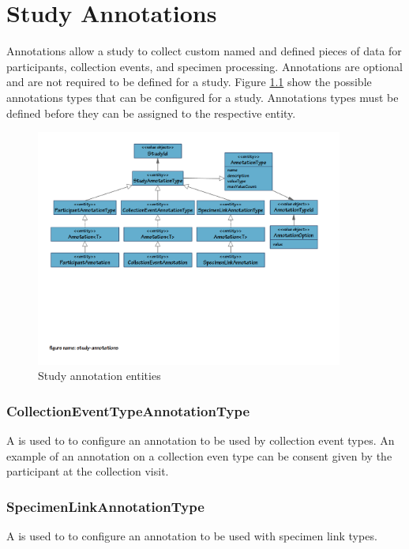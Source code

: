 \chapter{Study Annotations}
\label{chap:study-annotations}
Annotations allow a study to collect custom named and defined pieces of data
for participants, collection events, and specimen processing.  Annotations are
optional and are not required to be defined for a study. Figure
\ref{fig:study-annotations} show the possible annotations types that can be
configured for a study. Annotations types must be defined before they can be
assigned to the respective entity.

\begin{figure}[H]
  \centering
  \includegraphics[trim={9mm 90mm 20mm 9mm}, clip,
    width=0.9\textwidth]{images/study-annotations}
  \caption{Study annotation entities}
  \label{fig:study-annotations}
\end{figure}

\subsection*{CollectionEventTypeAnnotationType}
A  is used to to configure an
annotation to be used by collection event types. An example of an annotation on
a collection even type can be consent given by the participant at the
collection visit.

\subsection*{SpecimenLinkAnnotationType}
A  is used to to configure an
annotation to be used with specimen link types.

